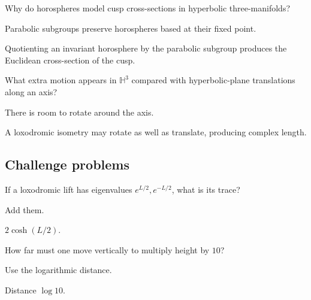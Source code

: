 \begin{exercise}\label{exr:vii36-ped-13}
Why do horospheres model cusp cross-sections in hyperbolic three-manifolds?
\end{exercise}

\begin{hint}
Parabolic subgroups preserve horospheres based at their fixed point.
\end{hint}

\begin{solution}
Quotienting an invariant horosphere by the parabolic subgroup produces the Euclidean cross-section of the cusp.
\end{solution}

\begin{exercise}[3D visualization]\label{exr:vii36-ped-14}
What extra motion appears in \(\mathbb H^3\) compared with hyperbolic-plane translations along an axis?
\end{exercise}

\begin{hint}
There is room to rotate around the axis.
\end{hint}

\begin{solution}
A loxodromic isometry may rotate as well as translate, producing complex length.
\end{solution}

\subsection*{Challenge problems}

\begin{exercise}\label{exr:vii36-ped-15}
If a loxodromic lift has eigenvalues \(e^{L/2},e^{-L/2}\), what is its trace?
\end{exercise}

\begin{hint}
Add them.
\end{hint}

\begin{solution}
\(2\cosh(L/2)\).
\end{solution}

\begin{exercise}\label{exr:vii36-ped-16}
How far must one move vertically to multiply height by \(10\)?
\end{exercise}

\begin{hint}
Use the logarithmic distance.
\end{hint}

\begin{solution}
Distance \(\log10\).
\end{solution}

